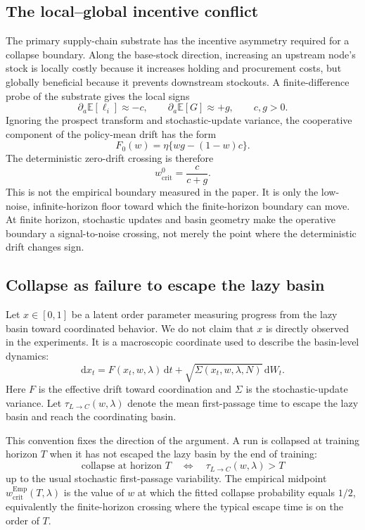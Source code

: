 \documentclass[letterpaper]{article} %
\theoremstyle{plain}
\newcommand{\wcrit}{w_{\mathrm{crit}}}
\begin{document}
\subsection{The local--global incentive conflict}
The primary supply-chain substrate has the incentive asymmetry required for a collapse boundary.
Along the base-stock direction, increasing an upstream node's stock is locally costly because it
increases holding and procurement costs, but globally beneficial because it prevents downstream
stockouts. A finite-difference probe of the substrate gives the local signs
\begin{equation}
 \partial_a \mathbb{E}[\ell_i]\approx -c,\qquad
 \partial_a \mathbb{E}[G]\approx +g,\qquad c,g>0.
\end{equation}
Ignoring the prospect transform and stochastic-update variance, the cooperative component of the
policy-mean drift has the form
\begin{equation}
 F_0(w)=\eta\{wg-(1-w)c\}.
 \label{eq:drift}
\end{equation}
The deterministic zero-drift crossing is therefore
\begin{equation}
 \wcrit^0=\frac{c}{c+g}.
\end{equation}
This is not the empirical boundary measured in the paper. It is only the low-noise,
infinite-horizon floor toward which the finite-horizon boundary can move. At finite horizon,
stochastic updates and basin geometry make the operative boundary a signal-to-noise crossing, not
merely the point where the deterministic drift changes sign.

\subsection{Collapse as failure to escape the lazy basin}
Let $x\in[0,1]$ be a latent order parameter measuring progress from the lazy basin toward
coordinated behavior. We do not claim that $x$ is directly observed in the experiments. It is a
macroscopic coordinate used to describe the basin-level dynamics:
\begin{equation}
 \mathrm{d}x_t = F(x_t,w,\lambda)\,\mathrm{d}t
 + \sqrt{\Sigma(x_t,w,\lambda,N)}\,\mathrm{d}W_t .
 \label{eq:sde}
\end{equation}
Here $F$ is the effective drift toward coordination and $\Sigma$ is the stochastic-update variance.
Let $\tau_{L\to C}(w,\lambda)$ denote the mean first-passage time to escape the lazy basin and
reach the coordinating basin.

This convention fixes the direction of the argument. A run is collapsed at training horizon $T$
when it has not escaped the lazy basin by the end of training:
\begin{equation}
 \text{collapse at horizon }T
 \quad\Longleftrightarrow\quad
 \tau_{L\to C}(w,\lambda)>T
\end{equation}
up to the usual stochastic first-passage variability. The empirical midpoint
$\wcrit^{\mathrm{Emp}}(T,\lambda)$ is the value of $w$ at which the fitted collapse probability
equals $1/2$, equivalently the finite-horizon crossing where the typical escape time is on the
order of $T$.
\end{document}
